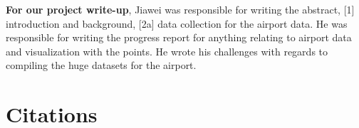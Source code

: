 \documentclass[10pt,twocolumn,twoside]{opticajnl}
\begin{document}
\textbf{For our project write-up}, Jiawei was responsible for writing the abstract, [1] introduction and background, [2a] data collection for the airport data. He was responsible for writing the progress report for anything relating to airport data and visualization with the points. He wrote his challenges with regards to compiling the huge datasets for the airport.

\section {Citations}

% 

\end{document}
